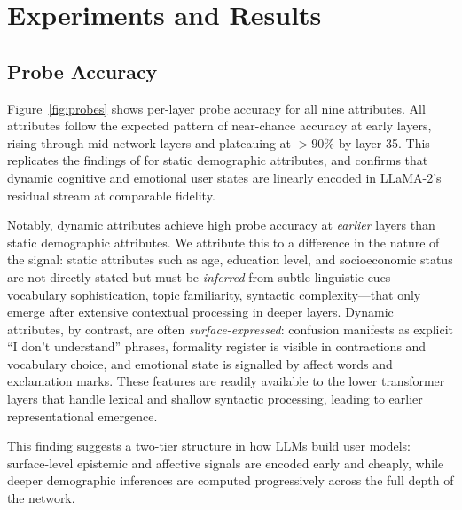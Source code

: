 \documentclass[11pt]{article}
\begin{document}
\section{Experiments and Results}

\subsection{Probe Accuracy}

Figure~\ref{fig:probes} shows per-layer probe accuracy for all nine attributes.
All attributes follow the expected pattern of near-chance accuracy at early layers,
rising through mid-network layers and plateauing at $>90\%$ by layer 35.
This replicates the findings of \citet{chen2024probing} for static demographic
attributes, and confirms that dynamic cognitive and emotional user states are
linearly encoded in LLaMA-2's residual stream at comparable fidelity.

Notably, dynamic attributes achieve high probe accuracy at \emph{earlier} layers
than static demographic attributes.  We attribute this to a difference in the
nature of the signal: static attributes such as age, education level, and
socioeconomic status are not directly stated but must be \emph{inferred} from
subtle linguistic cues—vocabulary sophistication, topic familiarity, syntactic
complexity—that only emerge after extensive contextual processing in deeper
layers.  Dynamic attributes, by contrast, are often \emph{surface-expressed}:
confusion manifests as explicit ``I don't understand'' phrases, formality
register is visible in contractions and vocabulary choice, and emotional state
is signalled by affect words and exclamation marks.  These features are readily
available to the lower transformer layers that handle lexical and shallow
syntactic processing, leading to earlier representational emergence.

This finding suggests a two-tier structure in how LLMs build user models:
surface-level epistemic and affective signals are encoded early and cheaply,
while deeper demographic inferences are computed progressively across the
full depth of the network.

\end{document}
